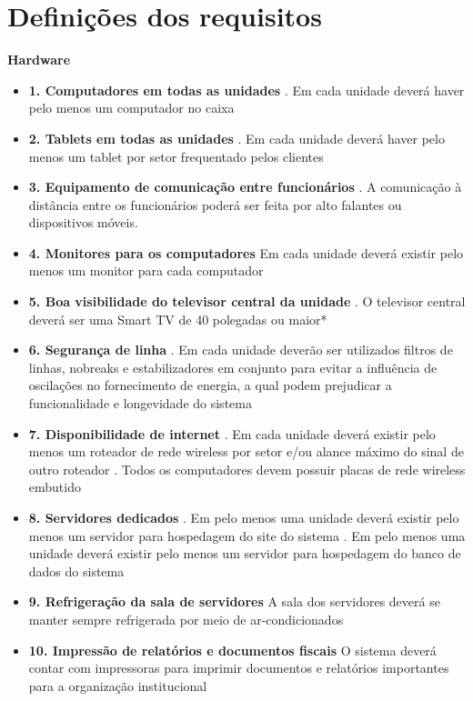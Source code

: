 \section{Definições dos requisitos}
\textbf{Hardware}
\begin{itemize}[label={}]
	\item \textbf{1. Computadores em todas as unidades}
		. Em cada unidade deverá haver pelo menos um computador no caixa
	\item \textbf{2. Tablets em todas as unidades}
		. Em cada unidade deverá haver pelo menos um tablet por setor frequentado pelos clientes
	\item \textbf{3. Equipamento de comunicação entre funcionários}
		. A comunicação à distância entre os funcionários poderá ser feita por alto falantes ou dispositivos móveis.
	\item \textbf{4. Monitores para os computadores}
		 Em cada unidade deverá existir pelo menos um monitor para cada computador
	\item \textbf{5. Boa visibilidade do televisor central da unidade}
		. O televisor central deverá ser uma Smart TV de 40 polegadas ou maior*
	\item \textbf{6. Segurança de linha}
		. Em cada unidade deverão ser utilizados filtros de linhas, nobreaks e estabilizadores em conjunto para evitar a influência de oscilações no fornecimento de energia, a qual podem prejudicar a funcionalidade e longevidade do sistema
	\item \textbf{7. Disponibilidade de internet}
		. Em cada unidade deverá existir pelo menos um roteador de rede wireless por setor e/ou alance máximo do sinal de outro roteador
		. Todos os computadores devem possuir placas de rede wireless embutido
	\item \textbf{8. Servidores dedicados}
		. Em pelo menos uma unidade deverá existir pelo menos um servidor para hospedagem do site do sistema
		. Em pelo menos uma unidade deverá existir pelo menos um servidor para hospedagem do banco de dados do sistema
	\item \textbf{9. Refrigeração da sala de servidores}
		 A sala dos servidores deverá se manter sempre refrigerada por meio de ar-condicionados
	\item \textbf{10. Impressão de relatórios e documentos fiscais}
		 O sistema deverá contar com impressoras para imprimir documentos e relatórios importantes para a organização institucional

\end{itemize}
